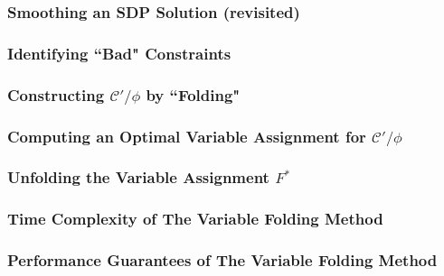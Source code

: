 \subsubsection{Smoothing an SDP Solution (revisited)}

\subsubsection{Identifying ``Bad" Constraints}

\subsubsection{Constructing $\mathcal{C}'/\phi$ by ``Folding"}

\subsubsection{Computing an Optimal Variable Assignment for $\mathcal{C}'/\phi$}

\subsubsection{Unfolding the Variable Assignment $F^*$}

\subsubsection{Time Complexity of The Variable Folding Method}

\subsubsection{Performance Guarantees of The Variable Folding Method}

%